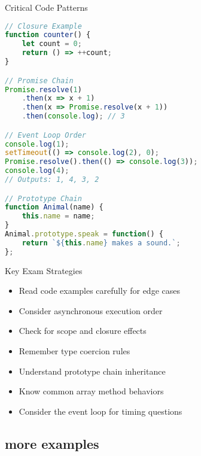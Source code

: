 \begin{examplecode}{Critical Code Patterns}
\begin{lstlisting}[language=JavaScript, style=basesmol]
// Closure Example
function counter() {
    let count = 0;
    return () => ++count;
}

// Promise Chain
Promise.resolve(1)
    .then(x => x + 1)
    .then(x => Promise.resolve(x + 1))
    .then(console.log); // 3

// Event Loop Order
console.log(1);
setTimeout(() => console.log(2), 0);
Promise.resolve().then(() => console.log(3));
console.log(4);
// Outputs: 1, 4, 3, 2

// Prototype Chain
function Animal(name) {
    this.name = name;
}
Animal.prototype.speak = function() {
    return `${this.name} makes a sound.`;
};
\end{lstlisting}
\end{examplecode}

\begin{theorem}{Key Exam Strategies}
    \begin{itemize}
        \item Read code examples carefully for edge cases
        \item Consider asynchronous execution order
        \item Check for scope and closure effects
        \item Remember type coercion rules
        \item Understand prototype chain inheritance
        \item Know common array method behaviors
        \item Consider the event loop for timing questions
    \end{itemize}
\end{theorem}

\subsection{more examples}


